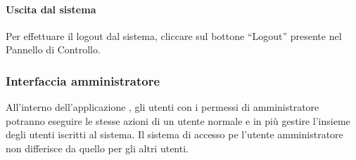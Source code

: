 \paragraph{Uscita dal sistema}
Per effettuare il logout dal sistema, cliccare sul bottone ``Logout'' presente nel Pannello di Controllo.

\subsubsection{Interfaccia amministratore}
All'interno dell'applicazione \progetto, gli utenti con i permessi di amministratore potranno eseguire le stesse azioni di un utente normale e in più gestire l'insieme degli utenti iscritti al sistema. Il sistema di accesso pe l'utente amministratore non differisce da quello per gli altri utenti.

